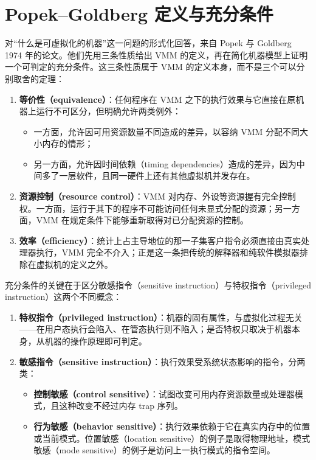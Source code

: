 \section{Popek--Goldberg 定义与充分条件}\label{sec:intro-pg}

对“什么是可虚拟化的机器”这一问题的形式化回答，来自 Popek 与 Goldberg 1974 年的论文。他们先用三条性质给出 VMM 的定义，再在简化机器模型上证明一个可判定的充分条件\cite{source1}。这三条性质属于 VMM 的定义本身，而不是三个可以分别取舍的定理：

\begin{enumerate}[label=\arabic*.,leftmargin=2.5em,itemsep=2pt]
\item \textbf{等价性（equivalence）}：任何程序在 VMM 之下的执行效果与它直接在原机器上运行不可区分，但明确允许两类例外：
  \begin{itemize}[label=--,leftmargin=1.5em,itemsep=1pt]
  \item 一方面，允许因可用资源数量不同造成的差异，以容纳 VMM 分配不同大小内存的情形；
  \item 另一方面，允许因时间依赖（timing dependencies）造成的差异，因为中间多了一层软件，且同一硬件上还有其他虚拟机并发存在。
  \end{itemize}
\item \textbf{资源控制（resource control）}：VMM 对内存、外设等资源握有完全控制权。一方面，运行于其下的程序不可能访问任何未显式分配的资源；另一方面，VMM 在规定条件下能够重新取得对已分配资源的控制。
\item \textbf{效率（efficiency）}：统计上占主导地位的那一子集客户指令必须直接由真实处理器执行，VMM 完全不介入；正是这一条把传统的解释器和纯软件模拟器排除在虚拟机的定义之外。
\end{enumerate}

充分条件的关键在于区分敏感指令（sensitive instruction）与特权指令（privileged instruction）这两个不同概念：

\begin{enumerate}[label=\arabic*.,leftmargin=2.5em,itemsep=2pt]
\item \textbf{特权指令（privileged instruction）}：机器的固有属性，与虚拟化过程无关——在用户态执行会陷入、在管态执行则不陷入；是否特权只取决于机器本身，从机器的操作原理即可判定。
\item \textbf{敏感指令（sensitive instruction）}：执行效果受系统状态影响的指令，分两类：
  \begin{itemize}[label=--,leftmargin=1.5em,itemsep=1pt]
  \item \textbf{控制敏感（control sensitive）}：试图改变可用内存资源数量或处理器模式，且这种改变不经过内存 trap 序列。
  \item \textbf{行为敏感（behavior sensitive）}：执行效果依赖于它在真实内存中的位置或当前模式。位置敏感（location sensitive）的例子是取得物理地址，模式敏感（mode sensitive）的例子是访问上一执行模式的指令空间。
  \end{itemize}
\end{enumerate}

